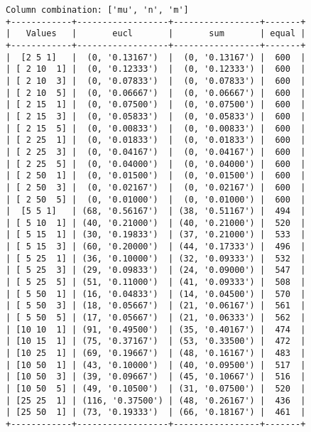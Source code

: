 \documentclass{article}
\begin{document}
\begin{verbatim}
Column combination: ['mu', 'n', 'm']
+------------+------------------+-----------------+-------+
|   Values   |       eucl       |       sum       | equal |
+------------+------------------+-----------------+-------+
|  [2 5 1]   |  (0, '0.13167')  |  (0, '0.13167') |  600  |
| [ 2 10  1] |  (0, '0.12333')  |  (0, '0.12333') |  600  |
| [ 2 10  3] |  (0, '0.07833')  |  (0, '0.07833') |  600  |
| [ 2 10  5] |  (0, '0.06667')  |  (0, '0.06667') |  600  |
| [ 2 15  1] |  (0, '0.07500')  |  (0, '0.07500') |  600  |
| [ 2 15  3] |  (0, '0.05833')  |  (0, '0.05833') |  600  |
| [ 2 15  5] |  (0, '0.00833')  |  (0, '0.00833') |  600  |
| [ 2 25  1] |  (0, '0.01833')  |  (0, '0.01833') |  600  |
| [ 2 25  3] |  (0, '0.04167')  |  (0, '0.04167') |  600  |
| [ 2 25  5] |  (0, '0.04000')  |  (0, '0.04000') |  600  |
| [ 2 50  1] |  (0, '0.01500')  |  (0, '0.01500') |  600  |
| [ 2 50  3] |  (0, '0.02167')  |  (0, '0.02167') |  600  |
| [ 2 50  5] |  (0, '0.01000')  |  (0, '0.01000') |  600  |
|  [5 5 1]   | (68, '0.56167')  | (38, '0.51167') |  494  |
| [ 5 10  1] | (40, '0.21000')  | (40, '0.21000') |  520  |
| [ 5 15  1] | (30, '0.19833')  | (37, '0.21000') |  533  |
| [ 5 15  3] | (60, '0.20000')  | (44, '0.17333') |  496  |
| [ 5 25  1] | (36, '0.10000')  | (32, '0.09333') |  532  |
| [ 5 25  3] | (29, '0.09833')  | (24, '0.09000') |  547  |
| [ 5 25  5] | (51, '0.11000')  | (41, '0.09333') |  508  |
| [ 5 50  1] | (16, '0.04833')  | (14, '0.04500') |  570  |
| [ 5 50  3] | (18, '0.05667')  | (21, '0.06167') |  561  |
| [ 5 50  5] | (17, '0.05667')  | (21, '0.06333') |  562  |
| [10 10  1] | (91, '0.49500')  | (35, '0.40167') |  474  |
| [10 15  1] | (75, '0.37167')  | (53, '0.33500') |  472  |
| [10 25  1] | (69, '0.19667')  | (48, '0.16167') |  483  |
| [10 50  1] | (43, '0.10000')  | (40, '0.09500') |  517  |
| [10 50  3] | (39, '0.09667')  | (45, '0.10667') |  516  |
| [10 50  5] | (49, '0.10500')  | (31, '0.07500') |  520  |
| [25 25  1] | (116, '0.37500') | (48, '0.26167') |  436  |
| [25 50  1] | (73, '0.19333')  | (66, '0.18167') |  461  |
+------------+------------------+-----------------+-------+
\end{verbatim}
\end{document}
